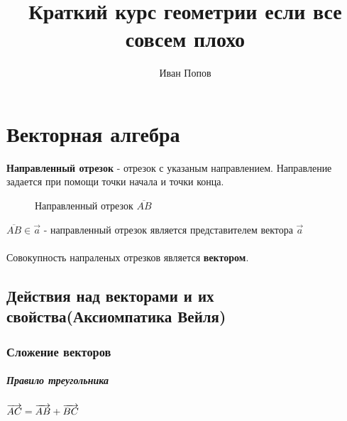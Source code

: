\documentclass{book}
\title{Краткий курс геометрии если все совсем плохо}
\author{Иван Попов}
\begin{document}
\maketitle
\newpage
{}

\tableofcontents

\newpage

\chapter{Векторная алгебра}
\textbf{Направленный отрезок} - отрезок с указаным направлением. Направление задается при помощи точки начала и точки конца.\\
\begin{figure}[h!]
    \centering
\caption{Направленный отрезок $\overline{AB}$}
\end{figure}
$\overline{AB} \in \overrightarrow{a}$ - направленный отрезок является представителем вектора $\overrightarrow{a}$
\\
\\
Совокупность напраленых отрезков является \textbf{вектором}.
\section{Действия над векторами и их свойства(Аксиомпатика Вейля)}
\subsection{Сложение векторов}
\paragraph{Правило треугольника}
$\\\\\overrightarrow{AC}=\overrightarrow{AB}+\overrightarrow{BC}$
\begin{figure}[h!]
\end{figure}
\end{document}
